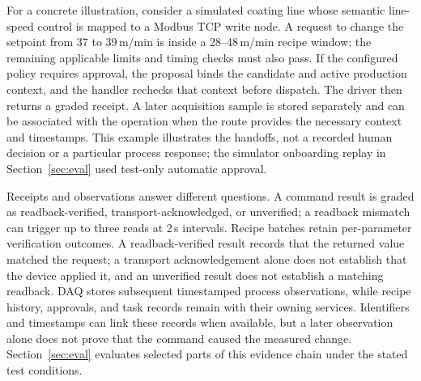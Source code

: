 For a concrete illustration, consider a simulated coating line whose semantic
line-speed control is mapped to a Modbus TCP write node. A request to change
the setpoint from 37 to 39\,m/min is inside a 28--48\,m/min recipe window;
the remaining applicable limits and timing checks must also pass. If the
configured policy requires approval, the proposal binds the candidate and
active production context, and the handler rechecks that context before
dispatch. The driver then returns a graded receipt. A later acquisition sample
is stored separately and can be associated with the operation when the route
provides the necessary context and timestamps. This example illustrates the
handoffs, not a recorded human decision or a particular process response; the
simulator onboarding replay in Section~\ref{sec:eval} used test-only automatic
approval.

Receipts and observations answer different questions. A command result is
graded as readback-verified, transport-acknowledged, or unverified; a
readback mismatch can trigger up to three reads at 2\,s intervals. Recipe
batches retain per-parameter verification outcomes. A readback-verified result
records that the returned value matched the request; a transport acknowledgement
alone does not establish that the device applied it, and an unverified result
does not establish a matching readback. DAQ stores subsequent timestamped
process observations, while recipe history, approvals, and task records remain
with their owning services. Identifiers and timestamps can link these records
when available, but a later observation alone does not prove that the command
caused the measured change. Section~\ref{sec:eval} evaluates selected parts of
this evidence chain under the stated test conditions.

